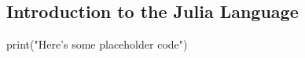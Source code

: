 \subsection{Introduction to the Julia Language}

\begin{jllisting}[language=julia, style=jlcodestyle]
    print("Here's some placeholder code")
\end{jllisting}